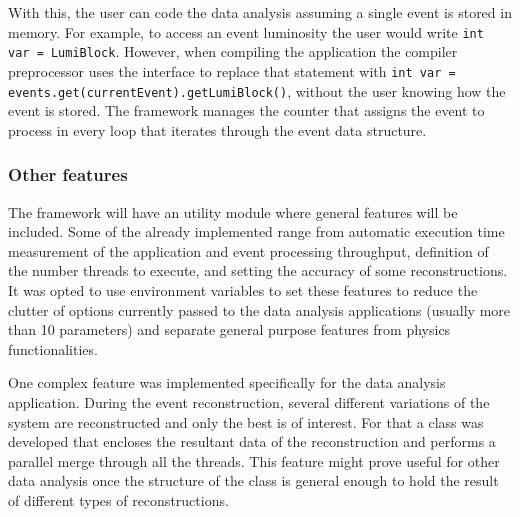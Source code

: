 With this, the user can code the data analysis assuming a single event is stored in memory. For example, to access an event luminosity the user would write \texttt{int var = LumiBlock}. However, when compiling the application the compiler preprocessor uses the interface to replace that statement with \texttt{int var = events.get(currentEvent).getLumiBlock()}, without the user knowing how the event is stored. The framework manages the counter that assigns the event to process in every loop that iterates through the event data structure.

\subsubsection*{Other features}

The framework will have an utility module where general features will be included. Some of the already implemented range from automatic execution time measurement of the application and event processing throughput, definition of the number threads to execute, and setting the accuracy of some reconstructions. It was opted to use environment variables to set these features to reduce the clutter of options currently passed to the data analysis applications (usually more than 10 parameters) and separate general purpose features from physics functionalities.

One complex feature was implemented specifically for the \ttH data analysis application. During the event reconstruction, several different variations of the system are reconstructed and only the best is of interest. For that a class was developed that encloses the resultant data of the reconstruction and performs a parallel merge through all the threads. This feature might prove useful for other data analysis once the structure of the class is general enough to hold the result of different types of reconstructions.
